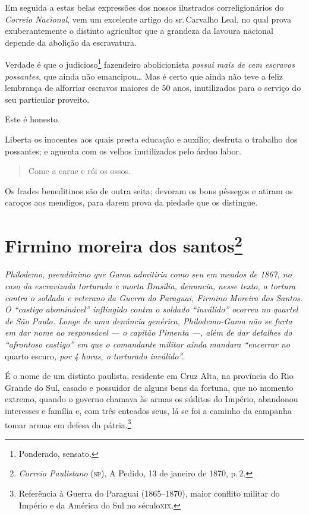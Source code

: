 Em seguida a estas belas expressões dos nossos ilustrados
correligionários do \emph{Correio Nacional}, vem um excelente artigo do
sr.\,Carvalho Leal, no qual prova exuberantemente o distinto agricultor
que a grandeza da lavoura nacional depende da abolição da escravatura.

Verdade é que o judicioso\footnote{ Ponderado, sensato.} fazendeiro
abolicionista \emph{possui mais de cem escravos possantes}, que ainda
não emancipou\ldots{} Mas é certo que ainda não teve a feliz lembrança de
alforriar escravos maiores de 50 anos, inutilizados para o serviço do
seu particular proveito.

Este é honesto.

Liberta os inocentes aos quais presta educação e auxílio; desfruta o
trabalho dos possantes; e aguenta com os velhos inutilizados pelo árduo
labor.

\begin{quote}
Come a carne e rói os ossos.
\end{quote}

Os frades beneditinos são de outra seita; devoram os bons pêssegos e
atiram os caroços aos mendigos, para darem prova da piedade que os
distingue.

\chapter{Firmino moreira dos santos\footnote{\emph{Correio Paulistano} (\textsc{sp}), A Pedido, 13 de janeiro de 1870,
  p.\,2.}} %

\begin{didascalia}
\emph{Philodemo, pseudônimo que Gama admitiria como seu em meados de
1867, no caso da escravizada torturada e morta Brasília, denuncia, nesse
texto, a tortura contra o soldado e veterano da Guerra do Paraguai,
Firmino Moreira dos Santos. O ``castigo abominável'' inflingido contra o
soldado ``inválido'' ocorreu no quartel de São Paulo. Longe de uma
denúncia genérica, Philodemo-Gama não se furta em dar nome ao
responsável --- o capitão Pimenta ---, além de dar detalhes do ``afrontoso
castigo'' em que o comandante militar ainda mandara ``encerrar no} quarto
escuro\emph{, por 4 horas, o torturado inválido''.}
\end{didascalia}


É o nome de um distinto paulista, residente em Cruz Alta, na província
do Rio Grande do Sul, casado e possuidor de alguns bens da fortuna, que
no momento extremo, quando o governo chamava às armas os súditos do
Império, abandonou interesses e família e, com três enteados seus, lá se
foi a caminho da campanha tomar armas em defesa da pátria.\footnote{
  Referência à Guerra do Paraguai (1865--1870), maior conflito militar do
  Império e da América do Sul no século\textsc{xix}.}


